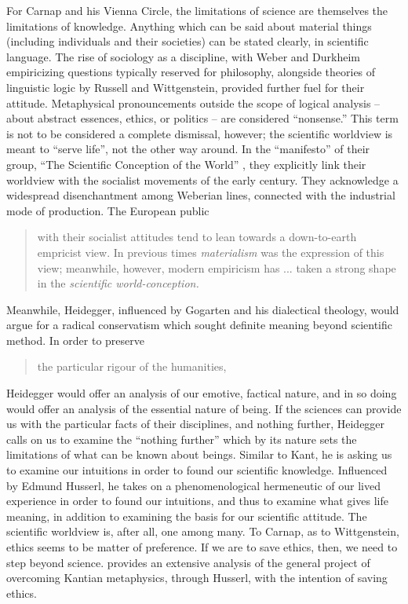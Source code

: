 \documentclass[leqno, 12pt]{turabian-researchpaper}
\begin{document}
	For Carnap and his Vienna Circle, the limitations of science are themselves the
	limitations of knowledge. Anything which can be said about material things (including
	individuals and their societies) can be stated clearly, in scientific language.
	The rise of sociology as a discipline, with Weber and Durkheim empiricizing questions
	typically reserved for philosophy, alongside theories of linguistic logic by
	Russell and Wittgenstein, provided further fuel for their attitude.
	Metaphysical pronouncements outside the scope of logical analysis -- about abstract
	essences, ethics, or politics -- are considered \enquote{nonsense.} This term is
	not to be considered a complete dismissal, however; the scientific worldview is
	meant to \enquote{serve life}, not the other way around. In the \enquote{manifesto}
	of their group, \enquote{The Scientific Conception of the World} \autocite{hahn1973},
	they explicitly link their worldview with the socialist movements of the early
	 century. They acknowledge a widespread disenchantment among Weberian lines,
	connected with the industrial mode of production. The European public \blockquote[{\cite[21-22]{hahn1973}}]{with their socialist attitudes tend to lean towards a down-to-earth empricist view. In previous times \emph{materialism} was the expression of this view; meanwhile, however, modern empiricism has ... taken a strong shape in the \emph{scientific world-conception.}}

	Meanwhile, Heidegger, influenced by Gogarten and his dialectical theology, would
	argue for a radical conservatism which sought definite meaning beyond scientific
	method. In order to preserve \blockquote[]{the particular rigour of the humanities,}
	Heidegger would offer an analysis of our emotive, factical nature, and in so doing
	would offer an analysis of the essential nature of being. If the sciences can
	provide us with the particular facts of their disciplines, and nothing further,
	Heidegger calls on us to examine the \enquote{nothing further} which by its nature
	sets the limitations of what can be known about beings. Similar to Kant, he is
	asking us to examine our intuitions in order to found our scientific knowledge.
	Influenced by Edmund Husserl, he takes on a phenomenological hermeneutic of our
	lived experience in order to found our intuitions, and thus to examine what
	gives life meaning, in addition to examining the basis for our scientific attitude.
	The scientific worldview is, after all, one among many. To Carnap, as to
	Wittgenstein, ethics seems to be matter of preference. If we are to save
	ethics, then, we need to step beyond science. \autocite{stone2017} provides an
	extensive analysis of the general project of overcoming Kantian metaphysics, through
	Husserl, with the intention of saving ethics.
\end{document}
